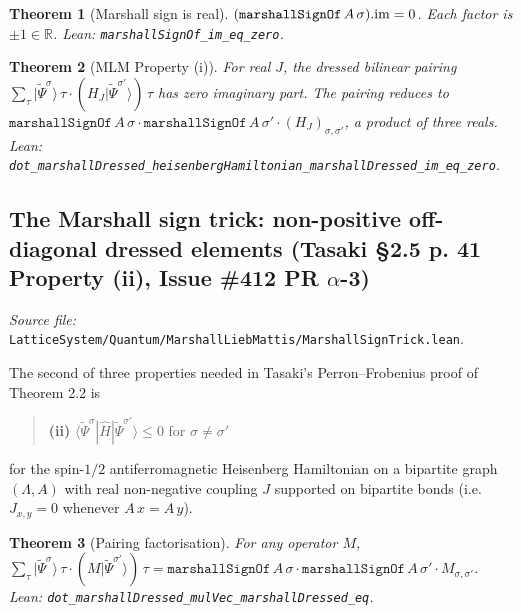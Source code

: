 \documentclass[a4paper,11pt]{article}
\newtheorem{theorem}{Theorem}
\begin{document}
\begin{theorem}[Marshall sign is real]
\label{thm:marshall-sign-real}
$(\texttt{marshallSignOf}\,A\,\sigma).{\rm im} = 0$.  Each factor
is $\pm 1 \in \mathbb{R}$.  Lean:
\texttt{marshallSignOf\_im\_eq\_zero}.
\end{theorem}

\begin{theorem}[MLM Property (i)]
\label{thm:dressed-bilinear-real}
For real $J$, the dressed bilinear pairing
$\sum_\tau |\widetilde{\Psi}^\sigma\rangle\,\tau \cdot
 (H_J |\widetilde{\Psi}^{\sigma'}\rangle)\,\tau$
has zero imaginary part.  The pairing reduces to
$\texttt{marshallSignOf}\,A\,\sigma \cdot
 \texttt{marshallSignOf}\,A\,\sigma' \cdot (H_J)_{\sigma,\sigma'}$,
a product of three reals.  Lean:
\texttt{dot\_marshallDressed\_heisenbergHamiltonian\_marshallDressed\_im\_eq\_zero}.
\end{theorem}

\subsection{The Marshall sign trick: non-positive off-diagonal
dressed elements (Tasaki §2.5 p. 41 Property (ii), Issue \#412
PR $\alpha$-3)}
\label{ssec:mlm-marshall-sign-trick}

\emph{Source file:}
\texttt{LatticeSystem/Quantum/MarshallLiebMattis/MarshallSignTrick.lean}.

The second of three properties needed in Tasaki's
Perron--Frobenius proof of Theorem 2.2 is

\begin{quote}
  \textbf{(ii)}
  $\langle \widetilde{\Psi}^\sigma | \hat H |
   \widetilde{\Psi}^{\sigma'}\rangle \le 0$
  for $\sigma \neq \sigma'$
\end{quote}

for the spin-$1/2$ antiferromagnetic Heisenberg Hamiltonian on a
bipartite graph $(\Lambda, A)$ with real non-negative coupling
$J$ supported on bipartite bonds (i.e. $J_{x,y} = 0$ whenever
$A\,x = A\,y$).

\begin{theorem}[Pairing factorisation]
\label{thm:dressed-pairing-factor}
For any operator $M$,
$\sum_\tau |\widetilde{\Psi}^\sigma\rangle\,\tau \cdot
 (M |\widetilde{\Psi}^{\sigma'}\rangle)\,\tau =
 \texttt{marshallSignOf}\,A\,\sigma \cdot
 \texttt{marshallSignOf}\,A\,\sigma' \cdot M_{\sigma,\sigma'}$.
Lean: \texttt{dot\_marshallDressed\_mulVec\_marshallDressed\_eq}.
\end{theorem}
\end{document}
